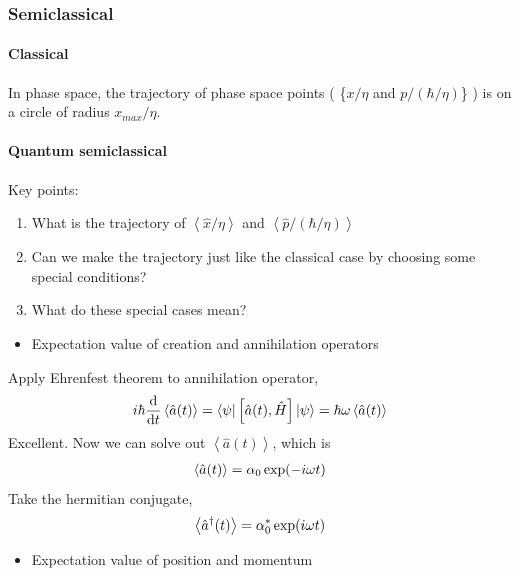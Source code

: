 \documentclass[letterpaper,10pt,english]{sphinxmanual}
\newcommand{\bra}[1]{\left\langle #1\right|}
\newcommand{\ket}[1]{\left| #1\right\rangle}
\newcommand{\avg}[1]{\left< #1 \right>}
\begin{document}
\subsubsection{Semiclassical}
\label{Quantum/QuantumMechanics:semiclassical}

\paragraph{Classical}
\label{Quantum/QuantumMechanics:classical}
In phase space, the trajectory of phase space points ( \{\(x/\eta\) and \(p/(\hbar/\eta)\)\} ) is on a circle of radius \(x_{max}/\eta\).


\paragraph{Quantum semiclassical}
\label{Quantum/QuantumMechanics:quantum-semiclassical}
Key points:
\begin{enumerate}
\item {} 
What is the trajectory of \(\left<\hat x/\eta\right>\) and \(\left<\hat p/(\hbar/\eta)\right>\)

\item {} 
Can we make the trajectory just like the classical case by choosing some special conditions?

\item {} 
What do these special cases mean?

\end{enumerate}
\begin{itemize}
\item {} 
Expectation value of creation and annihilation operators

\end{itemize}

Apply Ehrenfest theorem to annihilation operator,
\begin{gather}
\begin{split}i\hbar \frac{\mathrm d}{\mathrm d t} \avg{\hat a(t)} = \bra{\psi} \left[ \hat a(t), \hat H \right] \ket{\psi} = \hbar \omega \avg{\hat a(t)}\end{split}\notag
\end{gather}
Excellent. Now we can solve out \(\avg{\hat a(t)}\), which is
\begin{gather}
\begin{split}\avg{\hat a(t)} = \alpha_0 \exp(-i\omega t)\end{split}\notag
\end{gather}
Take the hermitian conjugate,
\begin{gather}
\begin{split}\avg{\hat a^\dagger (t)} = \alpha_0^* \exp(i\omega t)\end{split}\notag
\end{gather}\begin{itemize}
\item {} 
Expectation value of position and momentum

\end{itemize}
\end{document}
